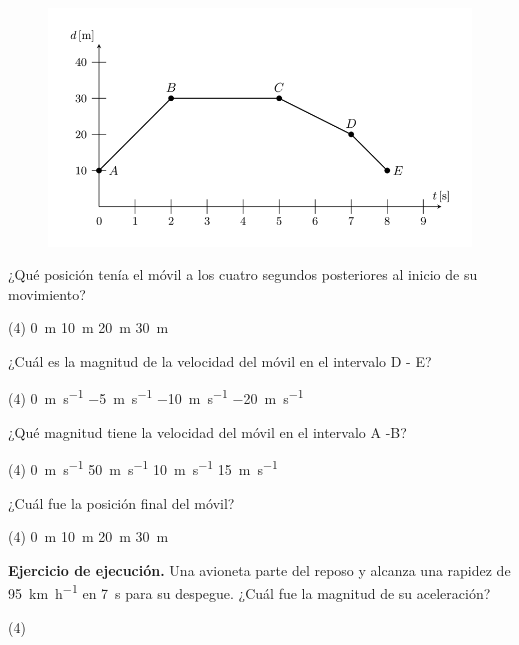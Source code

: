 \documentclass[12pt, letter]{exam}
\begin{document}
\begin{questions}
    \begin{figure}[H]
        \centering
        \includegraphics[scale=1.5]{Imagenes/Examen_Grafica_01.png}
    \end{figure}
    \question \label{grafica_01} ¿Qué posición tenía el móvil a los cuatro segundos posteriores al inicio de su movimiento?
    \begin{tasks}(4)
        \task \SI{0}{\meter}
        \task \SI{10}{\meter}
        \task \SI{20}{\meter}
        \task \SI{30}{\meter}
    \end{tasks}
    \question \label{grafica_02} ¿Cuál es la magnitud de la velocidad del móvil en el intervalo D - E?
    \begin{tasks}(4)
        \task \SI{0}{\meter\per\second}
        \task \SI{-5}{\meter\per\second}
        \task \SI{-10}{\meter\per\second}
        \task \SI{-20}{\meter\per\second}
    \end{tasks}
    \question \label{grafica_03} ¿Qué magnitud tiene la velocidad del móvil en el intervalo A -B?
    \begin{tasks}(4)
        \task \SI{0}{\meter\per\second}
        \task \SI{50}{\meter\per\second}
        \task \SI{10}{\meter\per\second}
        \task \SI{15}{\meter\per\second}
    \end{tasks}
    \question \label{grafica_04} ¿Cuál fue la posición final del móvil?
    \begin{tasks}(4)
        \task \SI{0}{\meter}
        \task \SI{10}{\meter}
        \task \SI{20}{\meter}
        \task \SI{30}{\meter}
    \end{tasks}
    \question \textbf{Ejercicio de ejecución.}  Una avioneta parte del reposo y alcanza una rapidez de \SI{95}{\kilo\meter\per\hour} en \SI{7}{\second} para su despegue. ¿Cuál fue la magnitud de su aceleración?
    \begin{tasks}(4)

\end{tasks}
\end{questions}
\end{document}
